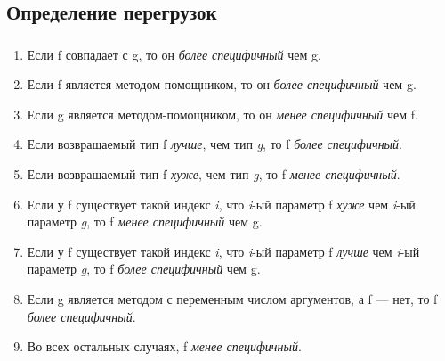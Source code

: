 \documentclass[t]{beamer}  %
\begin{document}
\subsection{Определение перегрузок}
\begin{frame}
\frametitle{\insertsection} 
  	\framesubtitle{\insertsubsection}
\begin{footnotesize}
\begin{enumerate}
    \item Если f совпадает с g, то он \textit{более специфичный} чем g.
    \item Если f является методом-помощником, то он \textit{более специфичный} чем g.
    \item Если g является методом-помощником, то он \textit{менее специфичный} чем f.
    \item Если возвращаемый тип f \textit{лучше}, чем тип \textit{g}, то f \textit{более специфичный}.
    \item Если возвращаемый тип f \textit{хуже}, чем тип \textit{g}, то f \textit{менее специфичный}.
    \item Если у f существует такой индекс \textit{i}, что \textit{i}-ый параметр f \textit{хуже} чем \textit{i}-ый параметр \textit{g}, то f \textit{менее специфичный} чем g.
    \item Если у f существует такой индекс \textit{i}, что \textit{i}-ый параметр f \textit{лучше} чем \textit{i}-ый параметр \textit{g}, то f \textit{более специфичный} чем g.
    \item Если g является методом с переменным числом аргументов, а f --- нет, то f \textit{более специфичный}.
    \item Во всех остальных случаях, f \textit{менее специфичный}.
\end{enumerate}
\end{footnotesize}
\end{frame}
\end{document}
